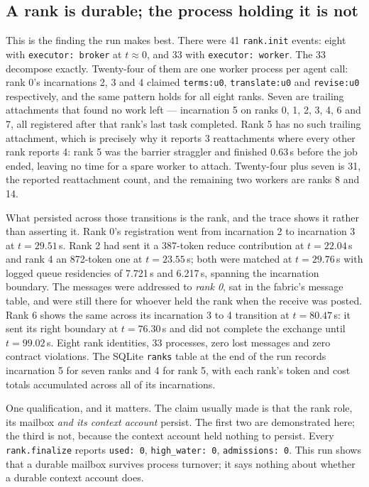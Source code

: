 \documentclass[11pt]{article}
\begin{document}
\subsection*{A rank is durable; the process holding it is not}

This is the finding the run makes best. There were 41 \texttt{rank.init} events: eight with
\texttt{executor: broker} at $t\approx0$, and 33 with \texttt{executor: worker}. The 33
decompose exactly. Twenty-four of them are one worker process per agent call: rank 0's
incarnations 2, 3 and 4 claimed \texttt{terms:u0}, \texttt{translate:u0} and
\texttt{revise:u0} respectively, and the same pattern holds for all eight ranks. Seven are
trailing attachments that found no work left --- incarnation 5 on ranks 0, 1, 2, 3, 4, 6
and 7, all registered after that rank's last task completed. Rank 5 has no such trailing
attachment, which is precisely why it reports 3 reattachments where every other rank
reports 4: rank 5 was the barrier straggler and finished 0.63\,s before the job ended,
leaving no time for a spare worker to attach. Twenty-four plus seven is 31, the reported
reattachment count, and the remaining two workers are ranks 8 and 14.

What persisted across those transitions is the rank, and the trace shows it rather than
asserting it. Rank 0's registration went from incarnation 2 to incarnation 3 at
$t=29.51$\,s. Rank 2 had sent it a 387-token reduce contribution at $t=22.04$\,s and rank 4
an 872-token one at $t=23.55$\,s; both were matched at $t=29.76$\,s with logged queue
residencies of 7.721\,s and 6.217\,s, spanning the incarnation boundary. The messages were
addressed to \emph{rank 0}, sat in the fabric's message table, and were still there for
whoever held the rank when the receive was posted. Rank 6 shows the same across its
incarnation 3 to 4 transition at $t=80.47$\,s: it sent its right boundary at $t=76.30$\,s
and did not complete the exchange until $t=99.02$\,s. Eight rank identities, 33 processes,
zero lost messages and zero contract violations. The SQLite \texttt{ranks} table at the end
of the run records incarnation 5 for seven ranks and 4 for rank 5, with each rank's token
and cost totals accumulated across all of its incarnations.

One qualification, and it matters. The claim usually made is that the rank role, its
mailbox \emph{and its context account} persist. The first two are demonstrated here; the
third is not, because the context account held nothing to persist. Every
\texttt{rank.finalize} reports \texttt{used: 0}, \texttt{high\_water: 0},
\texttt{admissions: 0}. This run shows that a durable mailbox survives process turnover; it
says nothing about whether a durable context account does.
\end{document}
